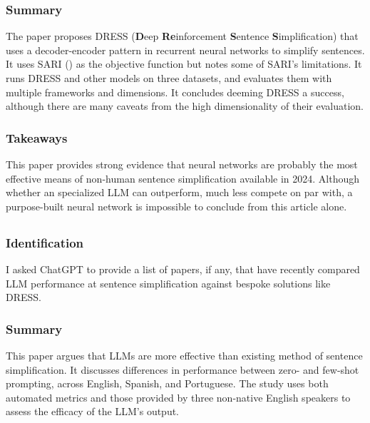 \documentclass[
	letterpaper, %
]{jdf}
\begin{document}
\subsubsection{Summary}
The paper proposes DRESS (\textbf{D}eep \textbf{Re}inforcement \textbf{S}entence \textbf{S}implification) that uses a decoder-encoder pattern in recurrent neural networks to simplify sentences. It uses SARI (\cite{xu-etal-2016-optimizing}) as the objective function but notes some of SARI's limitations. It runs DRESS and other models on three datasets, and evaluates them with multiple frameworks and dimensions. It concludes deeming DRESS a success, although there are many caveats from the high dimensionality of their evaluation.

\subsubsection{Takeaways}
This paper provides strong evidence that neural networks are probably the most effective means of non-human sentence simplification available in 2024. Although whether an specialized LLM can outperform, much less compete on par with, a purpose-built neural network is impossible to conclude from this article alone.

\subsection{}
\subsubsection{Identification}
I asked ChatGPT to provide a list of papers, if any, that have recently compared LLM performance at sentence simplification against bespoke solutions like DRESS. 

\subsubsection{Summary}
This paper argues that LLMs are more effective than existing method of sentence simplification. It discusses differences in performance between zero- and few-shot prompting, across English, Spanish, and Portuguese. The study uses both automated metrics and those provided by three non-native English speakers to assess the efficacy of the LLM's output.
\end{document}
